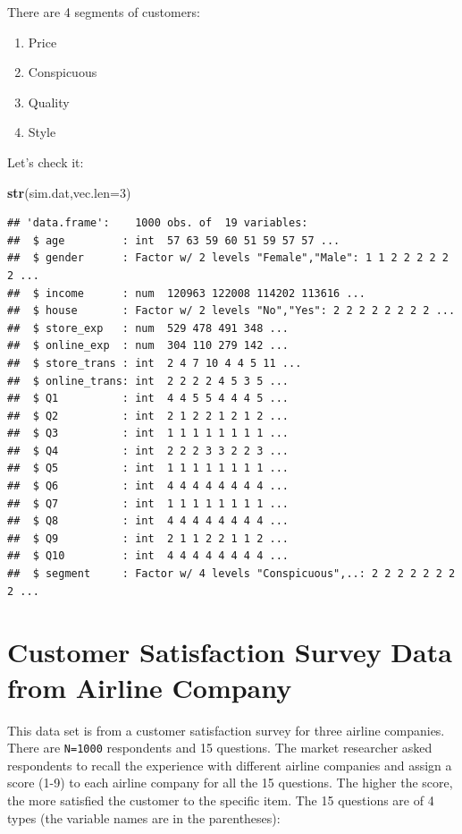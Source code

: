 \documentclass[12pt,]{krantz}
\newenvironment{Shaded}{\begin{snugshade}}{\end{snugshade}}
\newcommand{\KeywordTok}[1]{\textcolor[rgb]{0.13,0.29,0.53}{\textbf{{#1}}}}
\newcommand{\DataTypeTok}[1]{\textcolor[rgb]{0.13,0.29,0.53}{{#1}}}
\newcommand{\DecValTok}[1]{\textcolor[rgb]{0.00,0.00,0.81}{{#1}}}
\newcommand{\NormalTok}[1]{{#1}}
\providecommand{\tightlist}{%
  \setlength{\itemsep}{0pt}\setlength{\parskip}{0pt}}
\theoremstyle{definition}
\theoremstyle{definition}
\theoremstyle{remark}
\begin{document}
There are 4 segments of customers:

\begin{enumerate}
\def\labelenumi{\arabic{enumi}.}
\tightlist
\item
  Price
\item
  Conspicuous
\item
  Quality
\item
  Style
\end{enumerate}

Let's check it:

\begin{Shaded}
\begin{Highlighting}[]
\KeywordTok{str}\NormalTok{(sim.dat,}\DataTypeTok{vec.len=}\DecValTok{3}\NormalTok{)}
\end{Highlighting}
\end{Shaded}

\begin{verbatim}
## 'data.frame':    1000 obs. of  19 variables:
##  $ age         : int  57 63 59 60 51 59 57 57 ...
##  $ gender      : Factor w/ 2 levels "Female","Male": 1 1 2 2 2 2 2 2 ...
##  $ income      : num  120963 122008 114202 113616 ...
##  $ house       : Factor w/ 2 levels "No","Yes": 2 2 2 2 2 2 2 2 ...
##  $ store_exp   : num  529 478 491 348 ...
##  $ online_exp  : num  304 110 279 142 ...
##  $ store_trans : int  2 4 7 10 4 4 5 11 ...
##  $ online_trans: int  2 2 2 2 4 5 3 5 ...
##  $ Q1          : int  4 4 5 5 4 4 4 5 ...
##  $ Q2          : int  2 1 2 2 1 2 1 2 ...
##  $ Q3          : int  1 1 1 1 1 1 1 1 ...
##  $ Q4          : int  2 2 2 3 3 2 2 3 ...
##  $ Q5          : int  1 1 1 1 1 1 1 1 ...
##  $ Q6          : int  4 4 4 4 4 4 4 4 ...
##  $ Q7          : int  1 1 1 1 1 1 1 1 ...
##  $ Q8          : int  4 4 4 4 4 4 4 4 ...
##  $ Q9          : int  2 1 1 2 2 1 1 2 ...
##  $ Q10         : int  4 4 4 4 4 4 4 4 ...
##  $ segment     : Factor w/ 4 levels "Conspicuous",..: 2 2 2 2 2 2 2 2 ...
\end{verbatim}

\section{Customer Satisfaction Survey Data from Airline
Company}\label{customer-satisfaction-survey-data-from-airline-company}

This data set is from a customer satisfaction survey for three airline
companies. There are \texttt{N=1000} respondents and 15 questions. The
market researcher asked respondents to recall the experience with
different airline companies and assign a score (1-9) to each airline
company for all the 15 questions. The higher the score, the more
satisfied the customer to the specific item. The 15 questions are of 4
types (the variable names are in the parentheses):
\end{document}
